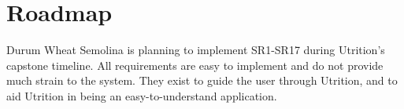 \documentclass{article}
\begin{document}
\section{Roadmap}


Durum Wheat Semolina is planning to implement SR1-SR17 during Utrition's capstone timeline. All requirements are easy to implement and do not provide much strain to the system. They exist to guide the user through Utrition, and to aid Utrition in being an easy-to-understand application.
	
\end{document}
